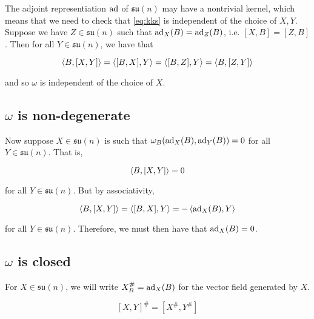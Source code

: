 \documentclass{report}
\newcommand{\su}{\mathfrak{su}}
\begin{document}
The adjoint representiation \(\operatorname{ad}\) of \(\su(n)\) may have a nontrivial kernel, which means that we need to check that \cref{eq:kks} is independent of the choice of \(X, Y\). Suppose we have \(Z \in \su(n)\) such that \(\operatorname{ad}_X(B) = \operatorname{ad}_Z(B)\), i.e. \([X, B] = [Z, B]\). Then for all \(Y \in \su(n)\), we have that

\[\left\langle B, [X, Y] \right\rangle = \left\langle [B, X], Y \right\rangle = \left\langle [B, Z], Y \right\rangle = \left\langle B, [Z, Y] \right\rangle\]

and so \(\omega\) is independent of the choice of \(X\).

\subsection{\(\omega\) is non-degenerate}

Now suppose \(X \in \su(n)\) is such that \(\omega_B(\operatorname{ad}_X(B), \operatorname{ad}_Y(B)) = 0\) for all \(Y \in \su(n)\). That is,

\[\left\langle B, [X, Y] \right\rangle = 0\]

for all \(Y \in \su(n)\). But by associativity,

\[\left\langle B, [X, Y] \right\rangle = \left\langle [B, X], Y \right\rangle = -\left\langle \operatorname{ad}_X(B), Y \right\rangle\]

for all \(Y \in \su(n)\). Therefore, we must then have that \(\operatorname{ad}_X(B) = 0\).

\subsection{\(\omega\) is closed}

For \(X \in \su(n)\), we will write \(X_B^\# = \operatorname{ad}_X(B)\) for the vector field generated by \(X\).

\begin{lemma}
    \[[X, Y]^\# = [X^\#, Y^\#]\]
\end{lemma}
\end{document}
